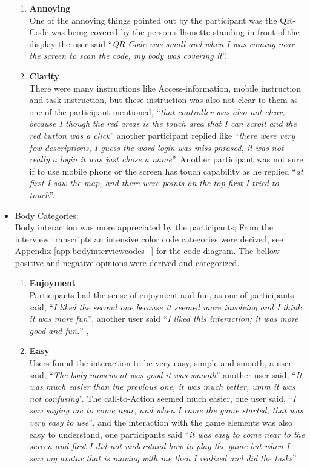 \begin{itemize}
\begin{enumerate}
\item	\textbf{Annoying}\\
One of the annoying things pointed out by the participant was the QR-Code was being covered by the person silhouette standing in front of the display the user said ``\emph{QR-Code was small and when I was coming near the screen to scan the code, my body was covering it}''.

\item	\textbf{Clarity}\\
There were many instructions like Access-information, mobile instruction and task instruction, but these instruction was also not clear to them as one of the participant mentioned, ``\emph{that controller was also not clear, because I though the red areas is the touch area that I can scroll and the red button was a click}'' another participant replied like ``\emph{there were very few descriptions, I guess the word login was miss-phrased, it was not really a login it was just chose a name}''. Another participant was not sure if to use mobile phone or the screen has touch capability as he replied ``\emph{at first I saw the map, and there were points on the top first I tried to touch}''.


\end{enumerate}


\item Body Categories: \\
Body interaction was more appreciated by the participants; From the interview transcripts an intensive color code categories were derived, see Appendix \ref{app:bodyinterviewcodes_} for the code diagram. The bellow positive and negative opinions were derived and categorized. 

\begin{enumerate}
\item	\textbf{Enjoyment}\\
Participants had the sense of enjoyment and fun, as one of participants said, ``\emph{I liked the second one because it seemed more involving and I think it was more fun}'', another user said ``\emph{I liked this interaction; it was more good and fun.}'' , 

\item	\textbf{Easy}\\
Users found the interaction to be very easy, simple and smooth, a user said, ``\emph{The body movement was good it was smooth}'' another user said, ``\emph{It was much easier than the previous one, it was much better, umm it was not confusing}''. The call-to-Action seemed much easier, one user said, ``\emph{I saw saying me to come near, and when I came the game started, that was very easy to use}'', and the interaction with the game elements was also easy to understand, one participants said ``\emph{it was easy to come near to the screen and first I did not understand how to play the game but when I saw my avatar that is moving with me then I realized and did the tasks}''


\end{enumerate}
\end{itemize}
